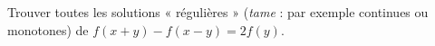 Trouver toutes les solutions « régulières » (\emph{tame} : par exemple continues ou monotones) de $f(x + y) - f(x - y) = 2f(y)$.
